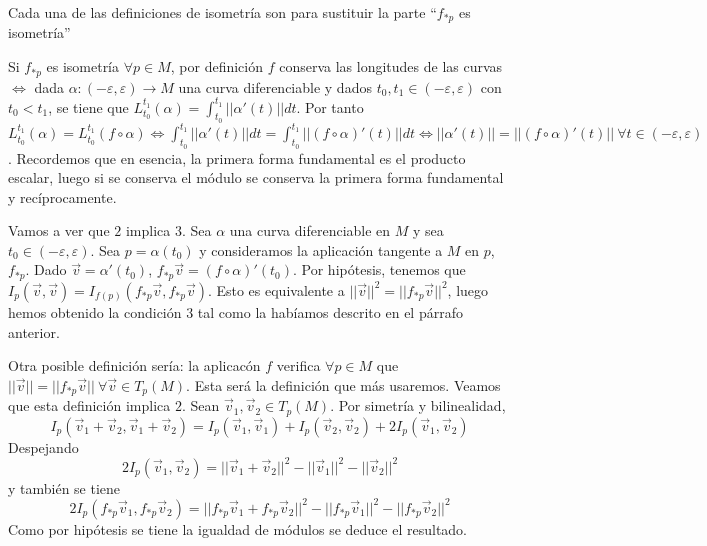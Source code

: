 \documentclass[GAP.tex]{subfiles}
\begin{document}
Cada una de las definiciones de isometría son para sustituir la parte ``$f_{*p}$ es isometría''
\begin{defi}
Si $f_{*p}$ es isometría $\forall p\in M$, por definición $f$ conserva las longitudes de las curvas $\Leftrightarrow$ dada $\alpha:(-\varepsilon,\varepsilon)\to M$ una curva diferenciable y dados $t_0,t_1\in (-\varepsilon,\varepsilon)$ con $t_0<t_1$, se tiene que $L_{t_0}^{t_1}(\alpha)=\int_{t_0}^{t_1}||\alpha'(t)||dt$. Por tanto $ L_{t_0}^{t_1}(\alpha)=L_{t_0}^{t_1}(f\circ\alpha)\Leftrightarrow\int_{t_0}^{t_1}||\alpha'(t)||dt=\int_{t_0}^{t_1}||(f \circ\alpha)'(t)||dt\Leftrightarrow ||\alpha'(t)||=||(f\circ\alpha)'(t)||\ \forall t\in (-\varepsilon,\varepsilon)$. Recordemos que en esencia, la primera forma fundamental es el producto escalar, luego si se conserva el módulo se conserva la primera forma fundamental y recíprocamente.

Vamos a ver que $2$ implica $3$. Sea $\alpha$ una curva diferenciable en $M$ y sea $t_0\in(-\varepsilon,\varepsilon)$. Sea $p=\alpha(t_0)$ y consideramos la aplicación tangente a $M$ en $p$, $f_{*p}$. Dado $\vec{v}=\alpha'(t_0)$, $f_{*p}\vec{v}=(f\circ\alpha)'(t_0)$. Por hipótesis, tenemos que $I_p(\vec{v},\vec{v})=I_{f(p)}(f_{*p}\vec{v},f_{*p}\vec{v})$. Esto es equivalente a $||\vec{v}||^2=||f_{*p}\vec{v}||^2$, luego hemos obtenido la condición $3$ tal como la habíamos descrito en el párrafo anterior.

Otra posible definición sería: la aplicacón $f$ verifica $\forall p\in M$ que $||\vec{v}||=||f_{*p}\vec{v}||\ \forall\vec{v}\in T_p(M)$. Esta será la definición que más usaremos. Veamos que esta definición implica $2$.  Sean $\vec{v}_1,\vec{v}_2\in T_p(M)$. Por simetría y bilinealidad, 
$$I_p(\vec{v}_1+\vec{v}_2,\vec{v}_1+\vec{v}_2)=I_p(\vec{v}_1,\vec{v}_1)+I_p(\vec{v}_2,\vec{v}_2)+2I_p(\vec{v}_1,\vec{v}_2)$$
Despejando
$$2I_p(\vec{v}_1,\vec{v}_2)=||\vec{v}_1+\vec{v}_2||^2-||\vec{v}_1||^2-||\vec{v}_2||^2$$
y también se tiene
$$2I_p(f_{*p}\vec{v}_1,f_{*p}\vec{v}_2)=||f_{*p}\vec{v}_1+f_{*p}\vec{v}_2||^2-||f_{*p}\vec{v}_1||^2-||f_{*p}\vec{v}_2||^2$$
Como por hipótesis se tiene la igualdad de módulos se deduce el resultado.
\end{defi}
\end{document}
